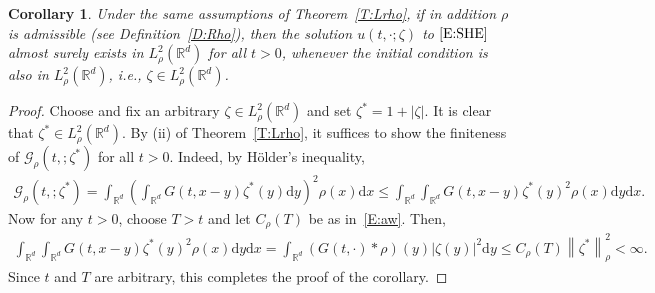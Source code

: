 \documentclass[a4paper,11pt]{article}%
\theoremstyle{plain}
\newtheorem{corollary}[theorem]{Corollary}
\theoremstyle{definition}
\numberwithin{equation}{section}
\newcommand{\R}{\mathbb{R}}
\newcommand{\Norm}[1]{\left\| #1 \right\|}
\newcommand{\ud}{\ensuremath{\mathrm{d}}}
\begin{document}
\begin{corollary}\label{C:inclusion}
  Under the same assumptions of Theorem~\ref{T:Lrho}, if in addition $\rho$ is admissible (see
  Definition~\ref{D:Rho}), then the solution $u(t,\cdot;\zeta)$ to $\eqref{E:SHE}$ almost surely
  exists in $L^2_{\rho}(\R^d)$ for all $t>0$, whenever the initial condition is also in
  $L^2_{\rho}(\R^d)$, i.e., $\zeta\in L^2_{\rho}(\R^d)$.
\end{corollary}
\begin{proof}
  Choose and fix an arbitrary $\zeta \in L^2_{\rho}(\R^d)$ and set $\zeta^* = 1+|\zeta|$. It is clear
  that $\zeta^*\in L^2_\rho(\R^d)$. By (ii) of Theorem~\ref{T:Lrho}, it suffices to show the
  finiteness of $\mathcal{G}_{\rho}(t,;\zeta^*)$ for all $t>0$. Indeed, by H\"older's inequality,
  \begin{align*}
        \mathcal{G}_{\rho}(t,;\zeta^*)
     = \int_{\R^d} \left(\int_{\R^d} G(t,x-y) \zeta^* (y) \ud y\right)^2 \rho(x) \ud x
    \le \int_{\R^d} \int_{\R^d} G(t,x-y) \zeta^* (y)^2 \rho(x) \ud y \ud x.
  \end{align*}
  Now for any $t>0$, choose $T>t$ and let $C_{\rho}(T)$ be as in~\eqref{E:aw}. Then,
  \begin{align*}
      \int_{\R^d} \int_{\R^d} G(t,x-y) \zeta^* (y)^2 \rho(x) \ud y \ud x
    = \int_{\R^d} \left(G(t,\cdot)*\rho\right)(y) |\zeta(y)|^2 \ud y
    \le C_{\rho}(T) \Norm{\zeta^*}_{\rho}^2 < \infty.
  \end{align*}
  Since $t$ and $T$ are arbitrary, this completes the proof of the corollary.
\end{proof}
\end{document}
